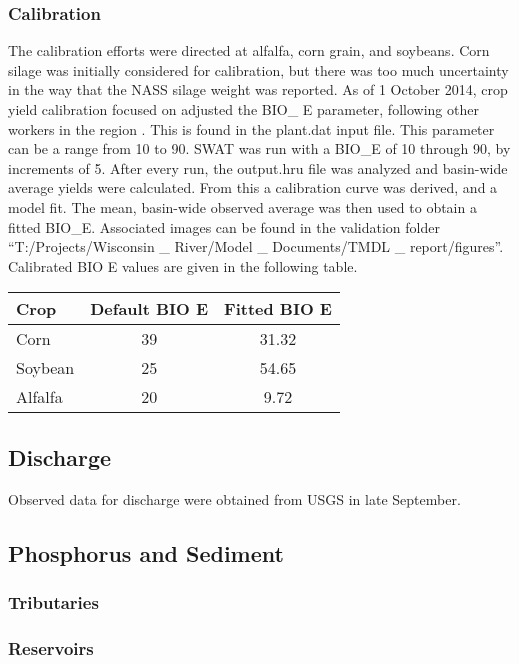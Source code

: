 \documentclass[10pt,letterpaper]{article}%
\begin{document}
		\subsubsection{Calibration}
		The calibration efforts were directed at alfalfa, corn grain, and soybeans. Corn silage was initially considered for calibration, but there was too much uncertainty in the way that the NASS silage weight was reported. As of 1 October 2014, crop yield calibration focused on adjusted the BIO\_ E parameter, following other workers in the region \citep{baumgart_lowerfox_2005, almendinger_contructingsunrise_2010}. This is found in the plant.dat input file. This parameter can be a range from 10 to 90. SWAT was run with a BIO\_E of 10 through 90, by increments of 5. After every run, the output.hru file was analyzed and basin-wide average yields were calculated. From this a calibration curve was derived, and a model fit. The mean, basin-wide observed average was then used to obtain a fitted BIO\_E. Associated images can be found in the validation folder ``T:/Projects/Wisconsin \_ River/Model \_ Documents/TMDL \_ report/figures''. Calibrated BIO E values are given in the following table.
		\begin{table}[h!]
		\centering
			\begin{tabular}{l c c}
				Crop & Default BIO E & Fitted BIO E \\[0.25ex]
				\hline \hline
				Corn & 39 & 31.32 \\
				Soybean & 25 & 54.65 \\
				Alfalfa & 20 & 9.72 \\
				\hline

			\end{tabular}
		\end{table}	
	\pagebreak
	\subsection{Discharge}
	Observed data for discharge were obtained from USGS in late September.
	\pagebreak
	\subsection{Phosphorus and Sediment}
		\subsubsection{Tributaries}
		\subsubsection{Reservoirs}
	\pagebreak
\end{document}
